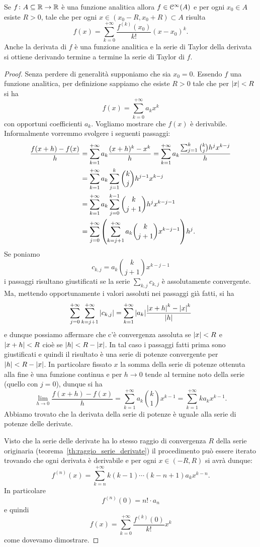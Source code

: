 \begin{theorem}
\label{th:48765}
Se $f\colon A\subseteq \mathbb R\to\mathbb R$ è una funzione analitica allora
$f\in \mathcal C^\infty(A)$ e per ogni $x_0\in A$ esiste $R>0$, tale che
per ogni $x \in (x_0-R, x_0+R)\subset A$ risulta
\begin{equation}\label{eq:2344494}
  f(x) = \sum_{k=0}^{+\infty} \frac{f^{(k)}(x_0)}{k!}(x-x_0)^k.
\end{equation}
Anche la derivata di $f$ è una funzione analitica e la serie
di Taylor della derivata si ottiene derivando termine a termine
la serie di Taylor di $f$.
\end{theorem}
%
\begin{proof}
Senza perdere di generalità supponiamo che sia $x_0=0$. Essendo $f$
una funzione analitica, per definizione sappiamo che esiste $R>0$
tale che per ${\left|x\right|}<R$ si ha
\[
f(x) = \sum_{k=0}^{+\infty} a_k x^k
\]
con opportuni coefficienti $a_k$. Vogliamo mostrare che $f(x)$ è derivabile.
Informalmente vorremmo svolgere i seguenti passaggi:
\begin{align*}
\frac{f(x+h) - f(x)}{h}
&= \sum_{k=1}^{+\infty} a_k \frac{(x+h)^k-x^k}{h}
= \sum_{k=1}^{+\infty} a_k \frac{\sum_{j=1}^k {k\choose j} h^j x^{k-j}}{h} \\
&= \sum_{k=1}^{+\infty} a_k \sum_{j=1}^k {k\choose j} h^{j-1} x^{k-j} \\
&= \sum_{k=1}^{+\infty} a_k \sum_{j=0}^{k-1} {k\choose j+1} h^j x^{k-j-1} \\
&= \sum_{j=0}^{+\infty} {\left( \sum_{k=j+1}^{+\infty} a_k {k\choose j+1} x^{k-j-1} \right)} h^j.
\end{align*}
Se poniamo
\[
  c_{k,j} = a_k {k\choose j+1} x^{k-j-1}
\]
i passaggi risultano giustificati se la serie $\sum_{k,j} c_{k,j}$
è assolutamente convergente. Ma, mettendo opportunamente
i valori assoluti nei passaggi già fatti, si ha
\[
  \sum_{j=0}^{+\infty} \sum_{k=j+1}^{+\infty} {\left|c_{k,j}\right|}
  =  \sum_{k=1}^{+\infty} {\left|a_k\right|} \frac{{\left|x+h\right|}^k-{\left|x\right|}^k}{{\left|h\right|}}
\]
e dunque possiamo affermare che c'è convergenza assoluta
se ${\left|x\right|}<R$ e ${\left|x+h\right|}<R$ cioè se ${\left|h\right|}< R-{\left|x\right|}$. In tal caso
i passaggi fatti prima sono giustificati e quindi il risultato
è una serie di potenze convergente per ${\left|h\right|}<R-{\left|x\right|}$. In particolare
fissato $x$
la somma della serie di potenze ottenuta alla fine è una funzione continua
e per $h\to 0$
tende al termine noto della serie (quello con $j=0$), dunque si ha
\[
  \lim_{h\to 0} \frac{f(x+h)-f(x)}{h}
  = \sum_{k=1}^{+\infty} a_k {k \choose 1} x^{k-1}
  = \sum_{k=1}^{+\infty} k a_k x^{k-1}.
\]
Abbiamo trovato che la derivata della serie di potenze è uguale
alla serie di potenze delle derivate.

Visto che la serie delle derivate ha lo stesso raggio di convergenza $R$
della serie originaria (teorema~\ref{th:raggio_serie_derivate})
il procedimento può essere iterato trovando che ogni derivata è derivabile
e per ogni $x\in (-R,R)$ si avrà dunque:
\[
  f^{(n)}(x) = \sum_{k=n}^{+\infty}k (k-1) \cdots (k-n+1) a_k x^{k-n}.
\]
In particolare
\[
  f^{(n)}(0) = n! \cdot a_n
\]
e quindi
\[
  f(x) = \sum_{k=0}^{+\infty} \frac{f^{(k)}(0)}{k!} x^k
\]
come dovevamo dimostrare.
\end{proof}


